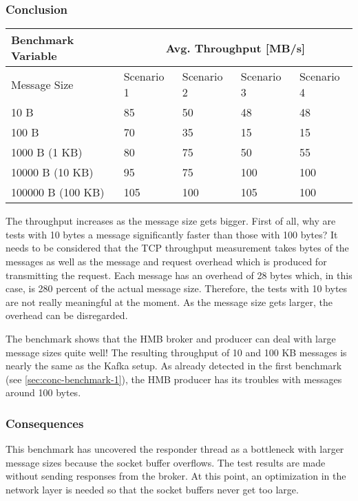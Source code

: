 \newpage
\subsubsection{Conclusion}
\begin{table}[H]
\centering
\begin{tabular}{|l|l|l|l|l|}
\hline
{\bf Benchmark Variable} & \multicolumn{4}{c|}{{\bf Avg. Throughput {[}MB/s{]}}} \\ \hline
Message Size             & Scenario 1       & Scenario 2       & Scenario 3     & Scenario 4 \\ \hline
10 B                     & 85               & 50               & 48             & 48         \\ \hline
100 B                    & 70               & 35               & 15             & 15         \\ \hline
1000 B (1 KB)            & 80               & 75               & 50             & 55         \\ \hline
10000 B (10 KB)          & 95               & 75               & 100            & 100         \\ \hline
100000 B (100 KB)        & 105              & 100              & 105            & 100         \\ \hline
\end{tabular}
\end{table}


The throughput increases as the message size gets bigger. First of
all, why are tests with 10 bytes a message significantly faster than those with
100 bytes? It needs to be considered that the TCP throughput measurement takes
bytes of the messages as well as the message and request overhead which is
produced for transmitting the request. Each message has an overhead of 28 bytes
which, in this case, is 280 percent of the actual message size. Therefore, the
tests with 10 bytes are not really meaningful at the moment. As the message
size gets larger, the overhead can be disregarded.

The benchmark shows that the HMB broker and producer can deal with large
message sizes quite well! The resulting throughput of 10 and 100 KB messages
is nearly the same as the Kafka setup. As already detected in the first benchmark
(see \ref{sec:conc-benchmark-1}), the HMB producer has its troubles with messages
around 100 bytes.

\subsubsection{Consequences}
This benchmark has uncovered the responder thread as a bottleneck with larger
message sizes because the socket buffer overflows. The test results are
made without sending responses from the broker. At this point, an optimization
in the network layer is needed so that the socket buffers never get too large.

